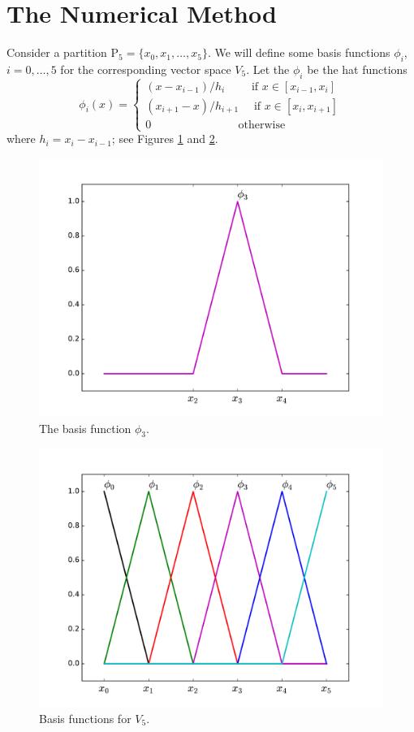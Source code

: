 \section*{The Numerical Method}
Consider a partition $\mathrm{P}_5 = \{x_0, x_1, \ldots, x_5\}$.
We will define some basis functions $\phi_i$, $i = 0, \ldots, 5$ for the corresponding vector space $V_5$.
Let the $\phi_i$ be the hat functions 
\[\phi_i(x) = \begin{cases}
(x - x_{i-1})/h_i \quad \quad\text{ if } x \in [x_{i-1},x_i]\\
 (x_{i+1} - x)/h_{i+1} \quad \text{ if } x \in [x_{i},x_{i+1}]\\
0 \quad \quad \quad \quad \quad \quad \quad \,\,\text{ otherwise}
\end{cases}\]
where $h_i = x_i - x_{i-1}$; see Figures \ref{fig:FEM_one_basis_function} and \ref{fig:FEM_basis_functions}. 

\begin{figure}[ht]
\centering
\includegraphics[width=\textwidth]{one_basis_function.pdf}
\caption{The basis function $\phi_3$.}
\label{fig:FEM_one_basis_function}
\end{figure}

\begin{figure}[ht]
\centering
\includegraphics[width=\textwidth]{basis_functions.pdf}
\caption{Basis functions for $V_5$.}
\label{fig:FEM_basis_functions}
\end{figure}

